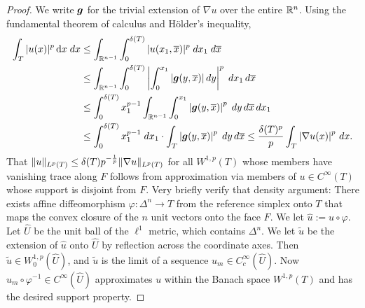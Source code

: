 \documentclass[10pt,a4paper]{article}
\begin{document}
\begin{proof}
    We write $\bm{g}$ for the trivial extension of $\nabla u$ over the entire ${\mathbb R}^{n}$.
    Using the fundamental theorem of calculus and H\"older's inequality, 
    \begin{align*}
        \int_{T} |u(x)|^{p} \mathop{}\!\mathrm{d} x \;dx
        &\leq
        \int_{{\mathbb R}^{n-1}} \int_{0}^{{\delta}(T)} |u( x_{1}, \overline x )|^{p} \;dx_{1} \;d\overline{x}
        \\&
        \leq
        \int_{{\mathbb R}^{n-1}} \int_{0}^{{\delta}(T)} \left| \int_{0}^{x_{1}} |\bm{g}( y, \overline x )| \,dy \right|^{p} \;dx_{1} \,d\overline{x}
        \\&
        \leq
        \int_{0}^{{\delta}(T)} x_{1}^{p-1} \int_{{\mathbb R}^{n-1}} \int_{0}^{x_{1}} \left| \bm{g}( y, \overline x ) \right|^{p} \;dy \,d\overline{x} \,dx_{1}
        \\&
        \leq
        \int_{0}^{{\delta}(T)} x_{1}^{p-1} \;dx_1 
        \cdot 
        \int_{T} \left| \bm{g}( y, \overline x ) \right|^{p} \;dy \,d\overline{x} 
        \leq
        \frac{{\delta}(T)^{p}}{p} \int_{T} \left| \nabla u( x ) \right|^{p} \,dx
        .
    \end{align*}
    That $\|u\|_{L^{p}(T)} \leq {\delta}(T) p^{-\frac 1 p} \|\nabla u\|_{L^{p}(T)}$ 
    for all $W^{1,p}(T)$ whose members have vanishing trace along $F$ follows from approximation via members of $u \in C^{\infty}(T)$ whose support is disjoint from $F$. 
    Very briefly verify that density argument: 
    There exists affine diffeomorphism $\varphi : \Delta^{n} \rightarrow T$ from the reference simplex onto $T$ that maps the convex closure of the $n$ unit vectors onto the face $F$.
    We let $\hat u := u \circ \varphi$.
    Let $\hat U$ be the unit ball of the $\ell^1$ metric, which contains $\Delta^{n}$.
    We let $\tilde u$ be the extension of $\hat u$ onto $\hat U$ by reflection across the coordinate axes.
    Then $\tilde u \in W^{1,p}_{0}(\hat U)$, and $\tilde u$ is the limit of a sequence $u_{m} \in C^{\infty}_{c}(\hat U)$.
    Now $u_{m} \circ \varphi^{-1} \in C^{\infty}(\hat U)$ approximates $u$ within the Banach space $W^{1,p}(T)$
    and has the desired support property. 
\end{proof}
\end{document}
